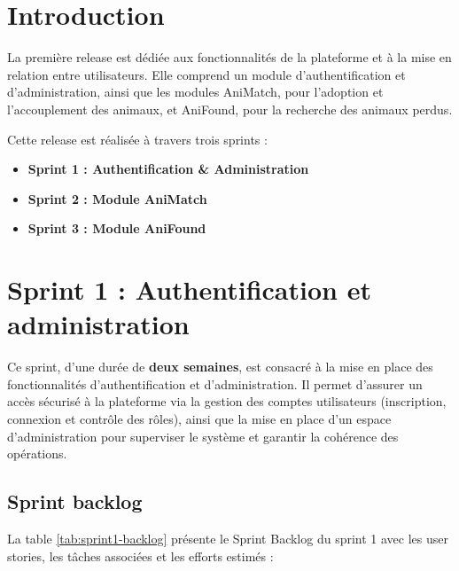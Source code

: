 \section{Introduction}

La première release est dédiée aux fonctionnalités de la plateforme et à la mise en relation entre utilisateurs. Elle comprend un module d’authentification et d’administration, ainsi que les modules AniMatch, pour l’adoption et l’accouplement des animaux, et AniFound, pour la recherche des animaux perdus.

Cette release est réalisée à travers trois sprints :
\begin{itemize}
    \item \textbf{Sprint 1 : Authentification \& Administration}
    \item \textbf{Sprint 2 : Module AniMatch}
    \item \textbf{Sprint 3 : Module AniFound}
\end{itemize}


 
\section{Sprint 1 : Authentification et administration} Ce sprint, d’une durée de \textbf{deux semaines}, est consacré à la mise en place des fonctionnalités d’authentification et d’administration. Il permet d’assurer un accès sécurisé à la plateforme via la gestion des comptes utilisateurs (inscription, connexion et contrôle des rôles), ainsi que la mise en place d’un espace d’administration pour superviser le système et garantir la cohérence des opérations. 
\subsection{Sprint backlog} 
La table \ref{tab:sprint1-backlog} présente le Sprint Backlog du sprint 1 avec les user stories, les tâches associées et les efforts estimés :


